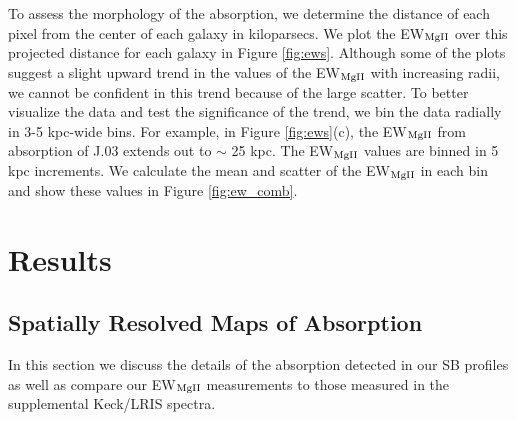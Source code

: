 \documentclass[twocolumn]{aastex61}
\begin{document}
To assess the morphology of the  absorption, we determine the distance of each pixel from the center of each galaxy in kiloparsecs. We plot the EW$_{\rm{MgII}}$ over this projected distance for each galaxy in Figure \ref{fig:ews}. Although some of the plots suggest a slight upward trend in the values of the EW$_{\rm{MgII}}$ with increasing radii, we cannot be confident in this trend because of the large scatter. To better visualize the data and test the significance of the trend, we bin the data radially in 3-5 kpc-wide bins. For example, in Figure \ref{fig:ews}(c), the EW$_{\rm{MgII}}$ from absorption of J.03 extends out to $\sim$ 25 kpc. The EW$_{\rm{MgII}}$ values are binned in 5 kpc increments. We calculate the mean and scatter of the EW$_{\rm{MgII}}$ in each bin and show these values in Figure \ref{fig:ew_comb}.   

\section{Results}\label{sec:results}

\subsection{Spatially Resolved Maps of  Absorption}
In this section we discuss the details of the absorption detected in our SB profiles as well as compare our EW$_{\rm{MgII}}$ measurements to those measured in the supplemental Keck/LRIS spectra. 
\end{document}
